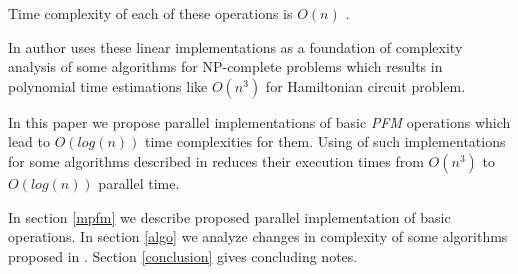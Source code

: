 
Time complexity of each of these operations is $O(n)$ \cite{Amos:1997, Katsanyi:2003}.

In \cite{Katsanyi:2003} author uses these linear implementations as a foundation of complexity analysis of some algorithms for NP-complete problems which results in polynomial time estimations like $O(n^3)$ for Hamiltonian circuit problem.

In this paper we propose parallel implementations of basic \emph{PFM} operations which lead to $O(log(n))$ time complexities for them. Using of such implementations for some algorithms described in \cite{Katsanyi:2003} reduces their execution times from $O(n^3)$ to $O(log(n))$ parallel time.

In section \ref{mpfm} we describe proposed parallel implementation of basic operations. In section \ref{algo} we analyze changes in complexity of some algorithms proposed in \cite{Katsanyi:2003}. Section \ref{conclusion} gives concluding notes.
